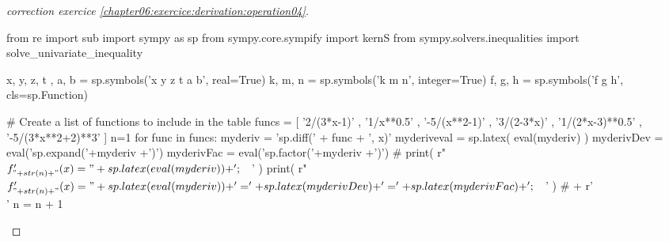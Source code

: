 \documentclass[main.tex]{subfiles}
\begin{document}
\begin{proof}[correction exercice \ref{chapter06:exercice:derivation:operation04}]%
\noindent
\begin{pycode}
from re import sub
import sympy as sp
from sympy.core.sympify import kernS
from sympy.solvers.inequalities import solve_univariate_inequality

x, y, z, t , a, b = sp.symbols('x y z t a b', real=True)
k, m, n = sp.symbols('k m n', integer=True)
f, g, h = sp.symbols('f g h', cls=sp.Function)


# Create a list of functions to include in the table
funcs = [
'2/(3*x-1)'
, '1/x**0.5' 
, '-5/(x**2-1)' 
, '3/(2-3*x)'
, '1/(2*x-3)**0.5'
, '-5/(3*x**2+2)**3' 
]
n=1 
for func in funcs: 
	myderiv = 'sp.diff(' + func + ', x)' 
	myderiveval = sp.latex( eval(myderiv) )
	myderivDev =  eval('sp.expand('+myderiv +')')
	myderivFac =  eval('sp.factor('+myderiv +')')
	# print(   r"$f'_{"+ str(n)+"}(x)=" + sp.latex( eval(myderiv) ) + '; \quad$' ) 
	print(   r"$f'_{"+ str(n)+"}(x)=" + sp.latex( eval(myderiv) ) + '=' + sp.latex(myderivDev)  + '=' + sp.latex(myderivFac) + '; \quad$' ) 
	# + r'\\' 
	n     = n + 1 
\end{pycode}
\end{proof}
\end{document}

